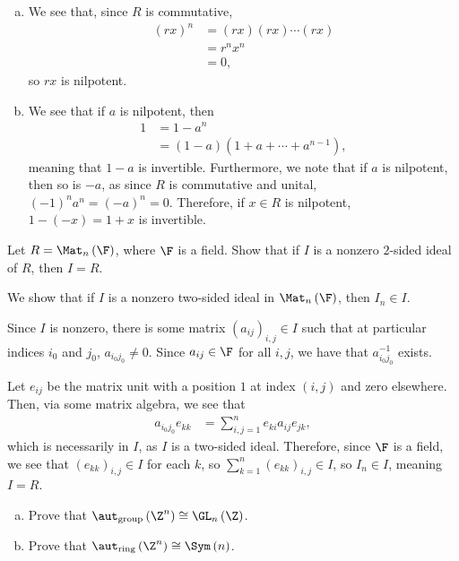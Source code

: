 \documentclass[10pt]{mypackage}
\begin{document}
\begin{solution}\hfill
  \begin{enumerate}[(a)]
    \item We see that, since $R$ is commutative,
      \begin{align*}
        \left( rx \right)^{n} &= \left( rx \right)\left( rx \right)\cdots \left( rx \right)\\
                              &= r^{n}x^{n}\\
                              &= 0,
      \end{align*}
      so $rx$ is nilpotent.
    \item We see that if $a$ is nilpotent, then
      \begin{align*}
        1 &= 1-a^{n}\\
          &= \left( 1-a \right)\left( 1 + a + \cdots + a^{n-1} \right),
      \end{align*}
      meaning that $1-a$ is invertible. Furthermore, we note that if $a$ is nilpotent, then so is $-a$, as since $R$ is commutative and unital, $\left( -1 \right)^{n}a^{n} = \left( -a \right)^{n} = 0$. Therefore, if $x\in R$ is nilpotent, $1-\left( -x \right) = 1+x$ is invertible.
  \end{enumerate}
\end{solution}
\begin{problem}[Problem 7]
  Let $R = \Mat_{n}\left( \F \right)$, where $\F$ is a field. Show that if $I$ is a nonzero $2$-sided ideal of $R$, then $I = R$.
\end{problem}
\begin{solution}
  We show that if $I$ is a nonzero two-sided ideal in $\Mat_{n}\left( \F \right)$, then $I_{n}\in I$.\newline

  Since $I$ is nonzero, there is some matrix $\left( a_{ij} \right)_{i,j}\in I$ such that at particular indices $i_0$ and $j_0$, $a_{i_0j_0}\neq 0$. Since $a_{ij}\in \F$ for all $i,j$, we have that $a_{i_0j_0}^{-1}$ exists.\newline

  Let $e_{ij}$ be the matrix unit with a position $1$ at index $\left( i,j \right)$ and zero elsewhere. Then, via some matrix algebra, we see that
  \begin{align*}
    a_{i_0j_0} e_{kk} &= \sum_{i,j=1}^{n}e_{ki}a_{ij}e_{jk},
  \end{align*}
  which is necessarily in $I$, as $I$ is a two-sided ideal. Therefore, since $\F$ is a field, we see that $\left( e_{kk} \right)_{i,j}\in I$ for each $k$, so $\sum_{k=1}^{n}\left( e_{kk} \right)_{i,j}\in I$, so $I_{n}\in I$, meaning $I = R$.
\end{solution}
\begin{problem}[Problem 8]\hfill
  \begin{enumerate}[(a)]
    \item Prove that $\aut_{\text{group}}\left( \Z^{n} \right) \cong \GL_{n}\left( \Z \right)$.
    \item Prove that $\aut_{\text{ring}} \left( \Z^{n} \right) \cong \Sym\left( n \right)$.
  \end{enumerate}
\end{problem}
\end{document}
